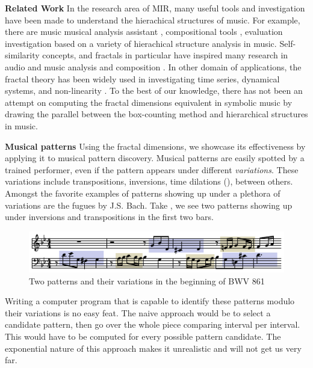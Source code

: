 \textbf{Related Work}
In the research area of MIR, many useful tools and investigation have been made to understand the hierachical structures of music.
For example, there are music musical analysis assistant \cite{hamanaka2009interactive, hamanaka2005atta}, compositional tools \cite{hamanaka2004automatic, hamanaka2005automatic}, evaluation investigation \cite{mcfee2017evaluating, mcfee2015hierarchical} based on a variety of hierachical structure analysis in music.
Self-similarity concepts, and fractals in particular have inspired many research in audio and music analysis \cite{bigerelle2000fractal,hsu1990fractal,hsu1991self} and composition \cite{sukumaran2009generation,leach1995nature}.
In other domain of applications, the fractal theory has been widely used in investigating time series, dynamical systems, and non-linearity \cite{accardo1997use, higuchi1988approach}.
To the best of our knowledge, there has not been an attempt on computing the fractal dimensions equivalent in symbolic music by drawing the parallel between the box-counting method and hierarchical structures in music. 

\textbf{Musical patterns}
Using the fractal dimensions, we showcase its effectiveness by applying it to
musical pattern discovery. 
Musical patterns are easily spotted by a trained performer,
even if the pattern appears under different \emph{variations}.  These
variations include transpositions, inversions, time dilations (), between
others. Amongst the favorite examples of patterns showing up under a
plethora of variations are the fugues by J.S. Bach. Take
, we see two patterns showing up under
inversions and transpositions in the first two bars.

\begin{figure}
  \includegraphics[width=\linewidth]{src/img/bwv861-start-section-patterns.pdf}
  \caption{Two patterns and their variations in the beginning of BWV 861}
  \label{fig:bwv861-start}
\end{figure}

Writing a computer program that is capable to identify these patterns modulo their variations is no easy feat.
The naive approach
would be to select a candidate pattern, then go over the whole
piece comparing interval per interval. This would have to be computed
for every possible pattern candidate. The exponential nature of this
approach makes it unrealistic and will not get us very far.

